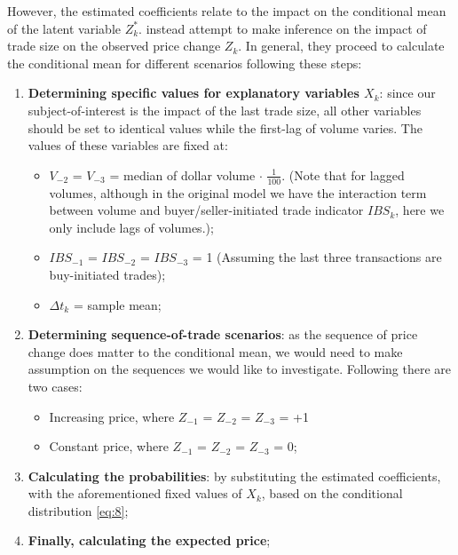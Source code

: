However, the estimated coefficients relate to the impact on the conditional mean of the latent variable $Z_k^*$. \citet{hausman1992} instead attempt to make inference on the impact of trade size on the observed price change $Z_k$. In general, they proceed to calculate the conditional mean for different scenarios following these steps:
\begin{enumerate}
    \item \textbf{Determining specific values for explanatory variables $X_k$}: since our subject-of-interest is the impact of the last trade size, all other variables should be set to identical values while the first-lag of volume varies. The values of these variables are fixed at:
    \begin{itemize}
    \item $V_{-2}$ = $V_{-3}$ = median of dollar volume $\cdot$ $\frac{1}{100}$. 
    (Note that for lagged volumes, although in the original model we have the interaction term between volume and buyer/seller-initiated trade indicator $IBS_k$, here we only include lags of volumes.);
    \item $IBS_{-1}$ = $IBS_{-2}$ = $IBS_{-3}$ = 1 (Assuming the last three transactions are buy-initiated trades);
    \item $\Delta t_k$ = sample mean;
    \end{itemize}
    \item \textbf{Determining sequence-of-trade scenarios}: as the sequence of price change does matter to the conditional mean, we would need to make assumption on the sequences we would like to investigate. Following \citet{hausman1992} there are two cases:
    \begin{itemize}
    \item Increasing price, where $Z_{-1}$ = $Z_{-2}$ = $Z_{-3}$ = +1
    \item Constant price, where $Z_{-1}$ = $Z_{-2}$ = $Z_{-3}$ = 0;
    \end{itemize}
    \item \textbf{Calculating the probabilities}: by substituting the estimated coefficients, with the aforementioned fixed values of $X_k$, based on the conditional distribution \eqref{eq:8};
    \item \textbf{Finally, calculating the expected price};
\end{enumerate}



